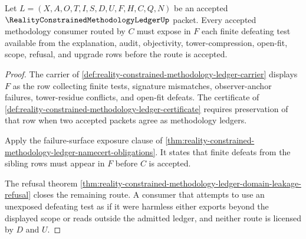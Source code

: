 \begin{theorem}
\label{thm:reality-constrained-methodology-ledger-failure-surface-exhaustion}
Let $L=(X,A,O,T,I,S,D,U,F,H,C,Q,N)$ be an accepted $\RealityConstrainedMethodologyLedgerUp$ packet. Every accepted methodology consumer routed by $C$ must expose in $F$ each finite defeating test available from the explanation, audit, objectivity, tower-compression, open-fit, scope, refusal, and upgrade rows before the route is accepted.
\end{theorem}
\begin{proof}
The carrier of \autoref{def:reality-constrained-methodology-ledger-carrier} displays $F$ as the row collecting finite tests, signature mismatches, observer-anchor failures, tower-residue conflicts, and open-fit defeats. The certificate of \autoref{def:reality-constrained-methodology-ledger-certificate} requires preservation of that row when two accepted packets agree as methodology ledgers.

Apply the failure-surface exposure clause of \autoref{thm:reality-constrained-methodology-ledger-namecert-obligations}. It states that finite defeats from the sibling rows must appear in $F$ before $C$ is accepted.

The refusal theorem \autoref{thm:reality-constrained-methodology-ledger-domain-leakage-refusal} closes the remaining route. A consumer that attempts to use an unexposed defeating test as if it were harmless either exports beyond the displayed scope or reads outside the admitted ledger, and neither route is licensed by $D$ and $U$.
\end{proof}

